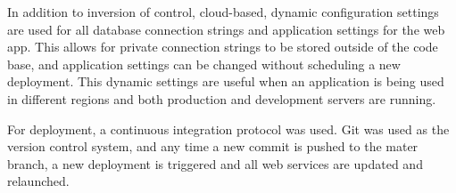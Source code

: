 In addition to inversion of control, cloud-based, dynamic configuration settings are used for all database connection strings and application settings for the web app. This allows for private connection strings to be stored outside of the code base, and application settings can be changed without scheduling a new deployment. This dynamic settings are useful when an application is being used in different regions and both production and development servers are running. 

For deployment, a continuous integration protocol was used. Git was used as the version control system, and any time a new commit is pushed to the mater branch, a new deployment is triggered and all web services are updated and relaunched.











